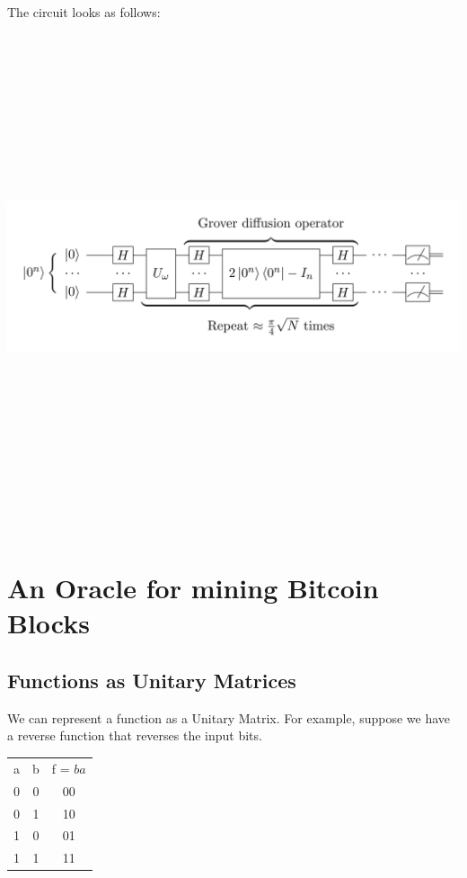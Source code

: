 \documentclass[11pt]{article} %
\begin{document}
The circuit looks as follows:\\

\noindent \includegraphics[keepaspectratio, width=15cm, height=15cm]{grover-circuit}

\section{An Oracle for mining Bitcoin Blocks}{}

\subsection{Functions as Unitary Matrices}{}
We can represent a function as a Unitary Matrix. For example, suppose we have a reverse function that reverses the input bits.

\begin{center}
\begin{tabular}{ |c|c|c| } 
 \hline
 a & b & f = $ba$ \\ 
 0 & 0 & 00 \\ 
 0 & 1 & 10 \\ 
 1 & 0 & 01 \\ 
 1 & 1 & 11 \\ 
 \hline
\end{tabular}
\end{center}
\end{document}
